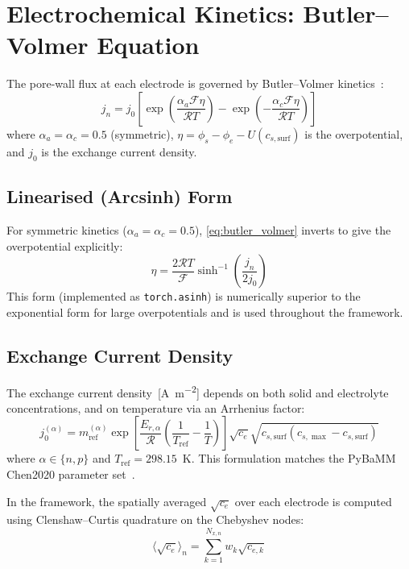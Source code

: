 \section{Electrochemical Kinetics: Butler--Volmer Equation}
\label{sec:butler_volmer}

The pore-wall flux at each electrode is governed by Butler--Volmer kinetics~\cite{Newman2004}:
\begin{equation}
  j_n = j_0 \left[\exp\!\left(\frac{\alpha_a \mathcal{F} \eta}{\mathcal{R} T}\right) - \exp\!\left(-\frac{\alpha_c \mathcal{F} \eta}{\mathcal{R} T}\right)\right]
  \label{eq:butler_volmer}
\end{equation}
where $\alpha_a = \alpha_c = 0.5$ (symmetric), $\eta = \phi_s - \phi_e - U(c_{s,\text{surf}})$ is the overpotential, and $j_0$ is the exchange current density.

\subsection{Linearised (Arcsinh) Form}

For symmetric kinetics ($\alpha_a = \alpha_c = 0.5$), \cref{eq:butler_volmer} inverts to give the overpotential explicitly:
\begin{equation}
  \eta = \frac{2\mathcal{R}T}{\mathcal{F}} \sinh^{-1}\!\left(\frac{j_n}{2 j_0}\right)
  \label{eq:bv_arcsinh}
\end{equation}
This form (implemented as \texttt{torch.asinh}) is numerically superior to the exponential form for large overpotentials and is used throughout the framework.

\subsection{Exchange Current Density}

The exchange current density~[\si{\ampere\per\meter\squared}] depends on both solid and electrolyte concentrations, and on temperature via an Arrhenius factor:
\begin{equation}
  j_0^{(\alpha)} = m_\text{ref}^{(\alpha)} \exp\!\left[\frac{E_{r,\alpha}}{\mathcal{R}}\left(\frac{1}{T_\text{ref}} - \frac{1}{T}\right)\right] \sqrt{c_e} \sqrt{c_{s,\text{surf}}(c_{s,\max} - c_{s,\text{surf}})}
  \label{eq:j0}
\end{equation}
where $\alpha \in \{n, p\}$ and $T_\text{ref} = 298.15$~K. This formulation matches the PyBaMM Chen2020 parameter set~\cite{Chen2020}.

In the framework, the spatially averaged $\sqrt{c_e}$ over each electrode is computed using Clenshaw--Curtis quadrature on the Chebyshev nodes:
\begin{equation}
  \langle\sqrt{c_e}\rangle_n = \sum_{k=1}^{N_{x,n}} w_k \sqrt{c_{e,k}}
  \label{eq:sqrt_ce_avg}
\end{equation}

